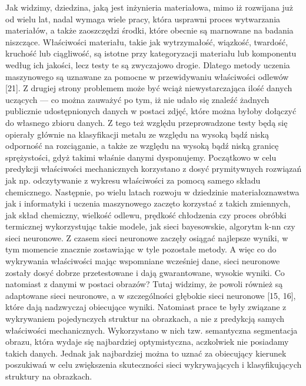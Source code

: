 Jak widzimy, dziedzina, jaką jest inżynieria materiałowa, mimo iż rozwijana już od wielu lat, nadal wymaga wiele pracy, która usprawni proces wytwarzania materiałów, a także zaoszczędzi środki, które obecnie są marnowane na badania niszczące. Właściwości materiału, takie jak wytrzymałość, wiązkość, twardość, kruchość lub ciągliwość, są istotne przy kategoryzacji materiału lub komponentu według ich jakości, lecz testy te są zwyczajowo drogie. Dlatego metody uczenia maszynowego są uznawane za pomocne w przewidywaniu właściwości odlewów [21]. Z drugiej strony problemem może być wciąż niewystarczająca ilość danych uczących —  co można zauważyć po tym, iż nie udało się znaleźć żadnych publicznie udostępnionych danych w postaci zdjęć, które można byłoby dołączyć do własnego zbioru danych. Z tego też względu przeprowadzone testy będą się opierały głównie na klasyfikacji metalu ze względu na wysoką bądź niską odporność na rozciąganie, a także ze względu na wysoką bądź niską granicę sprężystości, gdyż takimi właśnie danymi dysponujemy.
Początkowo w celu predykcji właściwości mechanicznych korzystano z dosyć prymitywnych rozwiązań jak np. odczytywanie z wykresu właściwości za pomocą samego składu chemicznego. Następnie, po wielu latach rozwoju w dziedzinie materiałoznawstwa jak i informatyki i uczenia maszynowego zaczęto korzystać z takich zmiennych, jak skład chemiczny, wielkość odlewu, prędkość chłodzenia czy proces obróbki termicznej wykorzystując takie modele, jak sieci bayesowskie, algorytm k-nn czy sieci neuronowe. Z czasem sieci neuronowe zaczęły osiągać najlepsze wyniki, w tym momencie znacznie zostawiając w tyle pozostałe metody. A więc co do wykrywania właściwości mając wspomniane wcześniej dane, sieci neuronowe zostały dosyć dobrze przetestowane i dają gwarantowane, wysokie wyniki. Co natomiast z danymi w postaci obrazów? Tutaj widzimy, że powoli również są adaptowane sieci neuronowe, a w szczególności głębokie sieci neuronowe [15, 16], które dają nadzwyczaj obiecujące wyniki. Natomiast prace te były związane z wykrywaniem pojedynczych struktur na obrazkach, a nie z predykcją samych właściwości mechanicznych. Wykorzystano w nich tzw. semantyczna segmentacja obrazu, która wydaje się najbardziej optymistyczna, aczkolwiek nie posiadamy takich danych. Jednak jak najbardziej można to uznać za obiecujący kierunek poszukiwań w celu zwiększenia skuteczności sieci wykrywających i klasyfikujących struktury na obrazkach.
